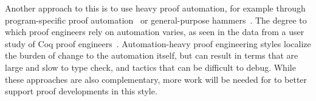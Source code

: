 Another approach to this is to use heavy proof automation, for example through
program-specific proof automation~\cite{Chlipala:2013:CPD:2584504}
or general-purpose hammers~\cite{Blanchette2016b, Blanchette2013, Kaliszyk2014, Czajka2018}.
The degree to which proof engineers rely on automation varies, as seen in the data from a user study of Coq proof engineers~\cite{replica}.
Automation-heavy proof engineering styles localize the burden of change to the automation itself,
but can result in terms that are large and slow to type check,
and tactics that can be difficult to debug.
While these approaches are also complementary, more work will be needed for \toolname to better support 
proof developments in this style.



